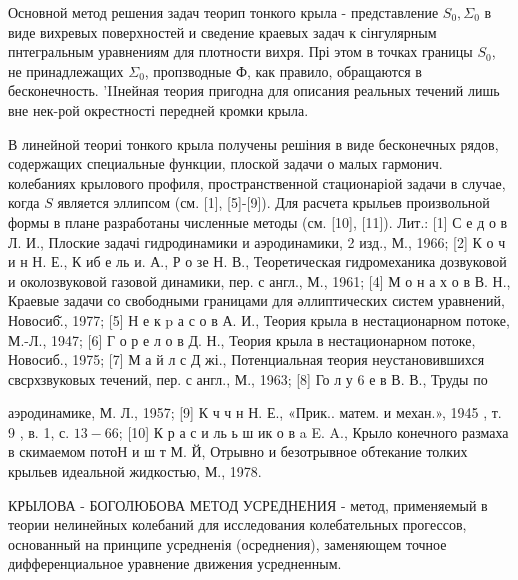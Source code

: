 \documentclass[10pt]{article}
\begin{document}
Основной метод решения задач теорип тонкого крыла - представление $S_{0}, \Sigma_{0}$ в виде вихревых поверхностей и сведение краевых задач к сінгулярным пнтегральным уравнениям для плотности вихря. Прі этом в точках границы $S_{0}$, не принадлежащих $\Sigma_{0}$, пропзводные Ф, как правило, обращаются в бесконечность. 'IIнейная теория пригодна для описания реальных течений лишь вне нек-рой окрестності передней кромки крыла.



В линейной теориі тонкого крыла получены решіния в виде бесконечных рядов, содержащих специальные функции, плоской задачи о малых гармонич. колебаниях крылового профиля, пространственной стационаріой задачи в случае, когда $S$ является эллипсом (см. [1], [5]-[9]). Для расчета крыльев произвольной формы в плане разработаны численные методы (см. [10], [11]). Лит.: [1] С е д о в Л. И., Плоские задачі гидродинамики и аэродинамики, 2 изд., М., 1966; [2] К о ч и н Н. Е., К иб е ль и. А., Р о зе Н. В., Теоретическая гидромеханика дозвуковой и околозвуковой газовой динамики, пер. с англ., М., 1961; [4] М о н а х о в В. Н., Краевые задачи со свободными границами для әллиптических систем уравнений, Новосиб̆., 1977; [5] Н е к p а с о в А. И., Теория крыла в нестационарном потоке, М.-Л., 1947; [6] Г о р е л о в Д. Н., Теория крыла в нестационарном потоке, Новосиб., 1975; [7] М а й л с Д жі., Потенциальная теория неустановившихся свсрхзвуковых течений, пер. с англ., М., 1963; [8] Го л у 6 е в В. В., Труды по

аэродинамике, М. Л., 1957; [9] К ч ч н Н. Е., «Прик.. матем. и механ.», 1945 , т. 9 , в. 1, с. $13-66$; [10] К р а с и ль ь ш ик о в a E. A., Крыло конечного размаха в скимаемом потоН и ш т М. Й, Отрывно и безотрывное обтекание толких крыльев идеальной жидкостью, М., 1978.



КРЫЛОВА - БОГОЛЮБОВА МЕТОД УСРЕДНЕНИЯ - метод, применяемый в теории нелинейных колебаний для исследования колебательных прогессов, основанный на принципе усредненія (осреднения), заменяющем точное дифференциальное уравнение движения усредненным.
\end{document}
